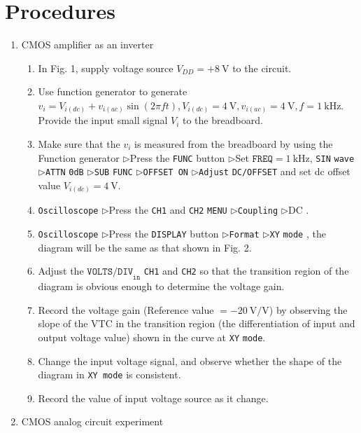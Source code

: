 \documentclass[12pt, a4paper]{article}
\def\large{\fontsize{14}{21}\selectfont}
\newcommand{\tri}{$\rhd$}
\begin{document}
\section{Procedures}
\begin{enumerate}[itemsep=0pt, label=\alph*.]
  \item {\large CMOS amplifier as an inverter} 
    \begin{enumerate}[label=(\arabic*)]
      \item In Fig. 1, supply voltage source $V_{DD} = +\SI{8}\V$ to the circuit.
      \item Use function generator to generate $v_i = V_{i(dc)} + v_{i(ac)} \sin(2 \pi ft), V_{i(dc)} = \SI{4}\V,
        v_{i(ac)} = \SI{4}\V, f = \SI{1}{\kHz}$. Provide the input small signal $V_i$ to the breadboard.
      \item Make sure that the $v_i$ is measured from the breadboard by using the
        Function generator  \tri Press the \texttt{FUNC} button \tri Set $\texttt{FREQ} = \SI{1}{\kHz}$, \texttt{SIN}
        \texttt{wave}  \tri  \texttt{ATTN} \texttt{0dB}  \tri  \texttt{SUB} \texttt{FUNC}  \tri  \texttt{OFFSET ON}  
        \tri \texttt{Adjust} \texttt{DC/OFFSET} and set dc offset value $V_{i(dc)} = \SI{4}\V$.
      \item \texttt{Oscilloscope}  \tri Press the \texttt{CH1} and \texttt{CH2} \texttt{MENU}  \tri  \texttt{Coupling} \tri DC .
      \item \texttt{Oscilloscope}  \tri Press the \texttt{DISPLAY} button  \tri  \texttt{Format}  \tri \texttt{XY} \texttt{mode} , the
        diagram will be the same as that shown in Fig. 2.
      \item Adjust the $\texttt{VOLTS/DIV}_{\texttt{in}}$ \texttt{CH1} and \texttt{CH2} so that the transition region of
        the diagram is obvious enough to determine the voltage gain.
      \item Record the voltage gain (Reference value $= −\SI{20}{\volt\per\volt}$) by
        observing the slope of the VTC in the transition region (the
        differentiation of input and output voltage value) shown in the curve at \texttt{XY}
        \texttt{mode}.
      \item Change the input voltage signal, and observe whether the shape of the
        diagram in \texttt{XY mode} is consistent.
      \item Record the value of input voltage source as it change.
    \end{enumerate}
  \item {\large CMOS analog circuit experiment} 

\end{enumerate}
\end{document}
